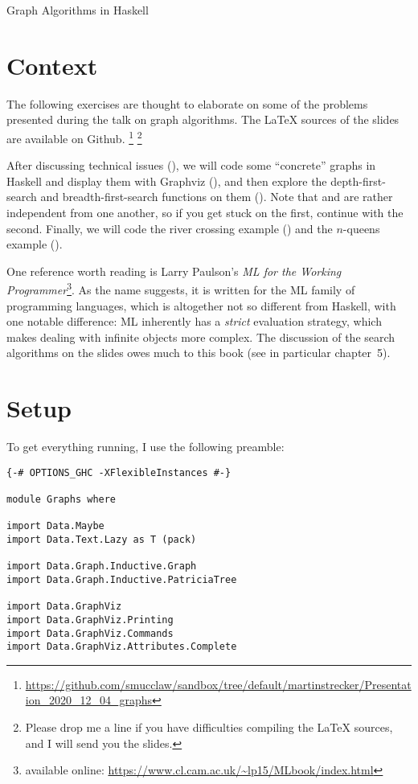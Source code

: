 \documentclass[english]{article}
\begin{document}
\begin{center}
  {\LARGE Graph Algorithms in Haskell}
\end{center}


\section{Context}\label{sec:context}

The following exercises are thought to elaborate on some of the problems
presented during the talk on graph algorithms. The \LaTeX{} sources of the
slides are available on Github.
\footnote{\url{https://github.com/smucclaw/sandbox/tree/default/martinstrecker/Presentation_2020_12_04_graphs}}
\footnote{Please drop me a line if you have difficulties compiling the \LaTeX{}
  sources, and I will send you the slides.}

After discussing technical issues (), we will code some
``concrete'' graphs in Haskell and display them with Graphviz
(), and then explore the depth-first-search and
breadth-first-search functions on them (). Note
that  and  are rather
independent from one another, so if you get stuck on the first, continue with
the second.  Finally, we will code the river crossing example
() and the $n$-queens example
().

One reference worth reading is Larry Paulson's \emph{ML for the Working
  Programmer}\footnote{available online:
  \url{https://www.cl.cam.ac.uk/~lp15/MLbook/index.html}}. As the name
suggests, it is written for the ML family of programming languages, which is
altogether not so different from Haskell, with one notable difference: ML
inherently has a \emph{strict} evaluation strategy, which makes dealing with
infinite objects more complex. The discussion of the search algorithms on the
slides owes much to this book (see in particular chapter~5).

\section{Setup}\label{sec:setup}

To get everything running, I use the following preamble:

\begin{lstlisting}
{-# OPTIONS_GHC -XFlexibleInstances #-}

module Graphs where

import Data.Maybe
import Data.Text.Lazy as T (pack)

import Data.Graph.Inductive.Graph
import Data.Graph.Inductive.PatriciaTree

import Data.GraphViz
import Data.GraphViz.Printing
import Data.GraphViz.Commands
import Data.GraphViz.Attributes.Complete
\end{lstlisting}
\end{document}

